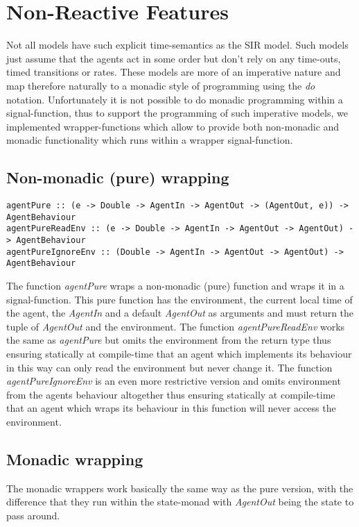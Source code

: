 \section{Non-Reactive Features}
Not all models have such explicit time-semantics as the SIR model. Such models just assume that the agents act in some order but don't rely on any time-outs, timed transitions or rates. These models are more of an imperative nature and map therefore naturally to a monadic style of programming using the \textit{do} notation. Unfortunately it is not possible to do monadic programming within a signal-function, thus to support the programming of such imperative models, we implemented wrapper-functions which allow to provide both non-monadic and monadic functionality which runs within a wrapper signal-function.

\subsection{Non-monadic (pure) wrapping}
\begin{verbatim}
agentPure :: (e -> Double -> AgentIn -> AgentOut -> (AgentOut, e)) -> AgentBehaviour
agentPureReadEnv :: (e -> Double -> AgentIn -> AgentOut -> AgentOut) -> AgentBehaviour
agentPureIgnoreEnv :: (Double -> AgentIn -> AgentOut -> AgentOut) -> AgentBehaviour
\end{verbatim}

The function \textit{agentPure} wraps a non-monadic (pure) function and wraps it in a signal-function. This pure function has the environment, the current local time of the agent, the \textit{AgentIn} and a default \textit{AgentOut} as arguments and must return the tuple of \textit{AgentOut} and the environment.
The function \textit{agentPureReadEnv} works the same as \textit{agentPure} but omits the environment from the return type thus ensuring statically at compile-time that an agent which implements its behaviour in this way can only read the environment but never change it.
The function \textit{agentPureIgnoreEnv} is an even more restrictive version and omits environment from the agents behaviour altogether thus ensuring statically at compile-time that an agent which wraps its behaviour in this function will never access the environment.

\subsection{Monadic wrapping}
The monadic wrappers work basically the same way as the pure version, with the difference that they run within the state-monad with \textit{AgentOut} being the state to pass around.


